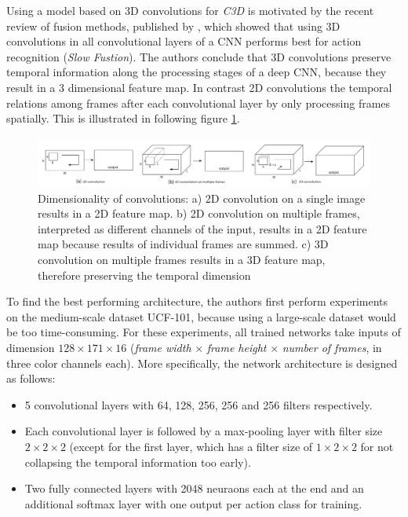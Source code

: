 Using a model based on 3D convolutions for \textit{C3D} is motivated by the recent review of fusion methods, published by \textcite{karpathy_large-scale_2014}, which showed that using 3D convolutions in all convolutional layers of a CNN performs best for action recognition (\textit{Slow Fustion}).  
The authors conclude that 3D convolutions preserve temporal information along the processing stages of a deep CNN, because they result in a 3 dimensional feature map.
In contrast 2D convolutions the temporal relations among frames after each convolutional layer by only processing frames spatially.
This is illustrated in following figure \ref{fig:c3d_2dconv3dconv}.
\begin{figure}[H]
    \centering
    \includegraphics[width=\textwidth]{img_deep/c3d_2dconv3dconv}
\caption{Dimensionality of convolutions: a) 2D convolution on a single image results in a 2D feature map. b) 2D convolution on multiple frames, interpreted as different channels of the input, results in a 2D feature map because results of individual frames are summed. c) 3D convolution on multiple frames results in a 3D feature map, therefore preserving the temporal dimension \cite{karpathy_large-scale_2014}}
    \label{fig:c3d_2dconv3dconv}
\end{figure}

To find the best performing architecture, the authors first perform experiments on the medium-scale dataset UCF-101\cite{soomro_ucf101:_2012}, because using a large-scale dataset would be too time-consuming.
For these experiments, all trained networks take inputs of dimension $128\times171\times16$ (\textit{frame width} $\times$ \textit{frame height} $\times$ \textit{number of frames}, in three color channels each).
More specifically, the network architecture is designed as follows:
\begin{itemize}
    \item 5 convolutional layers with 64, 128, 256, 256 and 256 filters respectively.
    \item Each convolutional layer is followed by a max-pooling layer with filter size $2\times2\times2$ (except for the first layer, which has a filter size of $1\times2\times2$ for not collapsing the temporal information too early).
    \item Two fully connected layers with 2048 neuraons each at the end and an additional softmax layer with one output per action class for training.
\end{itemize}

